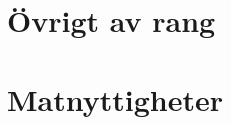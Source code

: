 \documentclass[8pt,twoside]{extreport} %
\begin{document}
\newpage





\newpage


\chapter{Övrigt av rang}

\newpage

%



\newpage

















\newpage


\chapter{Matnyttigheter}
\newpage


\end{document}
